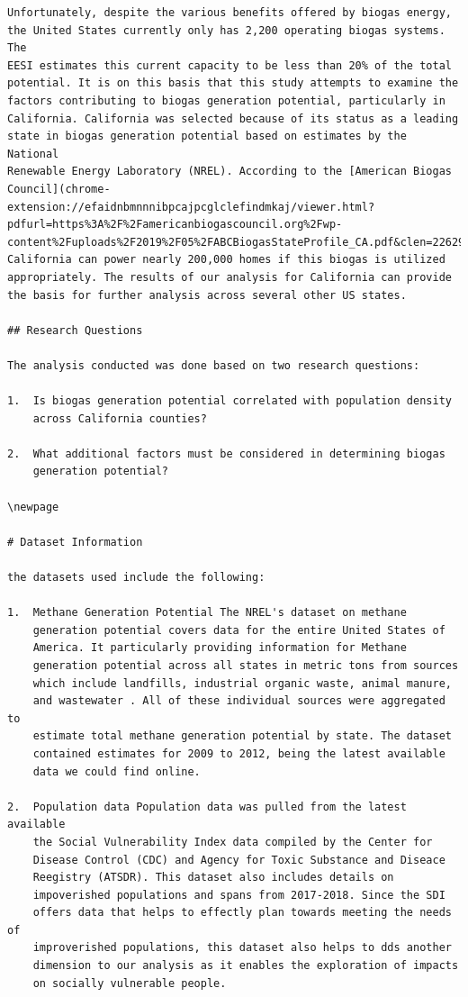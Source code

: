 \documentclass[
  12pt,
]{article}
\begin{document}
\begin{verbatim}
Unfortunately, despite the various benefits offered by biogas energy,
the United States currently only has 2,200 operating biogas systems. The
EESI estimates this current capacity to be less than 20% of the total
potential. It is on this basis that this study attempts to examine the
factors contributing to biogas generation potential, particularly in
California. California was selected because of its status as a leading
state in biogas generation potential based on estimates by the National
Renewable Energy Laboratory (NREL). According to the [American Biogas
Council](chrome-extension://efaidnbmnnnibpcajpcglclefindmkaj/viewer.html?pdfurl=https%3A%2F%2Famericanbiogascouncil.org%2Fwp-content%2Fuploads%2F2019%2F05%2FABCBiogasStateProfile_CA.pdf&clen=226298&chunk=true),
California can power nearly 200,000 homes if this biogas is utilized
appropriately. The results of our analysis for California can provide
the basis for further analysis across several other US states.

## Research Questions

The analysis conducted was done based on two research questions:

1.  Is biogas generation potential correlated with population density
    across California counties?

2.  What additional factors must be considered in determining biogas
    generation potential?

\newpage

# Dataset Information

the datasets used include the following:

1.  Methane Generation Potential The NREL's dataset on methane
    generation potential covers data for the entire United States of
    America. It particularly providing information for Methane
    generation potential across all states in metric tons from sources
    which include landfills, industrial organic waste, animal manure,
    and wastewater . All of these individual sources were aggregated to
    estimate total methane generation potential by state. The dataset
    contained estimates for 2009 to 2012, being the latest available
    data we could find online.

2.  Population data Population data was pulled from the latest available
    the Social Vulnerability Index data compiled by the Center for
    Disease Control (CDC) and Agency for Toxic Substance and Diseace
    Reegistry (ATSDR). This dataset also includes details on
    impoverished populations and spans from 2017-2018. Since the SDI
    offers data that helps to effectly plan towards meeting the needs of
    improverished populations, this dataset also helps to dds another
    dimension to our analysis as it enables the exploration of impacts
    on socially vulnerable people.


\end{verbatim}
\end{document}
